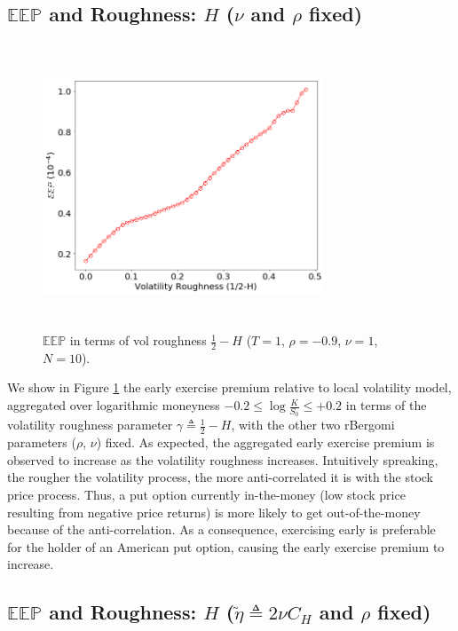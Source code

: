 \documentclass[12pt]{article}
\numberwithin{equation}{section}
\begin{document}
\subsection{$\mathbb{EEP}$ and Roughness: $H$ ($\nu$ and $\rho$ fixed)}
\begin{figure}[!htb]
\begin{center}
  \includegraphics[width=0.75\textwidth, height=8.5cm]{eep_H}
\caption{$\mathbb{EEP}$ in terms of vol roughness $\frac{1}{2}-H$ ($T=1$, $\rho=-0.9$, $\nu=1$, $N=10$).}
\label{fig:eep_H}
\end{center}
\end{figure}
We show in Figure \ref{fig:eep_H} the early exercise premium relative to local volatility model, aggregated over logarithmic moneyness $-0.2\le\log \frac{K}{S_0}\le +0.2$ in terms of the volatility roughness parameter $\gamma\triangleq \frac{1}{2}-H$, with the other two rBergomi parameters ($\rho$, $\nu$) fixed. As expected, the aggregated early exercise premium is observed to increase as the volatility roughness increases. Intuitively spreaking, the rougher the volatility process, the more anti-correlated it is with the stock price process. Thus, a put option currently in-the-money (low stock price resulting from negative price returns) is more likely to get out-of-the-money because of the anti-correlation. As a consequence, exercising early is preferable for the holder of an American put option, causing the early exercise premium to increase.

\subsection{$\mathbb{EEP}$ and Roughness: $H$ ($\tilde{\eta}\triangleq 2\nu C_H$ and $\rho$ fixed)}
\end{document}
